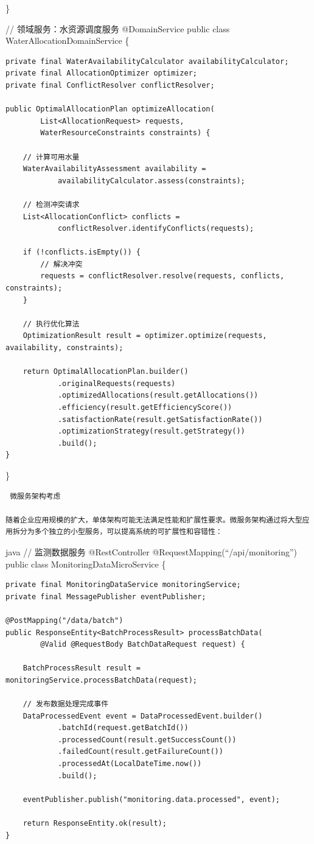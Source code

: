 \}

// 领域服务：水资源调度服务 @DomainService public class WaterAllocationDomainService \{

\begin{verbatim}
private final WaterAvailabilityCalculator availabilityCalculator;
private final AllocationOptimizer optimizer;
private final ConflictResolver conflictResolver;

public OptimalAllocationPlan optimizeAllocation(
        List<AllocationRequest> requests, 
        WaterResourceConstraints constraints) {
    
    // 计算可用水量
    WaterAvailabilityAssessment availability = 
            availabilityCalculator.assess(constraints);
    
    // 检测冲突请求
    List<AllocationConflict> conflicts = 
            conflictResolver.identifyConflicts(requests);
    
    if (!conflicts.isEmpty()) {
        // 解决冲突
        requests = conflictResolver.resolve(requests, conflicts, constraints);
    }
    
    // 执行优化算法
    OptimizationResult result = optimizer.optimize(requests, availability, constraints);
    
    return OptimalAllocationPlan.builder()
            .originalRequests(requests)
            .optimizedAllocations(result.getAllocations())
            .efficiency(result.getEfficiencyScore())
            .satisfactionRate(result.getSatisfactionRate())
            .optimizationStrategy(result.getStrategy())
            .build();
}
\end{verbatim}

\}

\begin{lstlisting}
 微服务架构考虑

随着企业应用规模的扩大，单体架构可能无法满足性能和扩展性要求。微服务架构通过将大型应用拆分为多个独立的小型服务，可以提高系统的可扩展性和容错性：
\end{lstlisting}

java // 监测数据服务 @RestController @RequestMapping(``/api/monitoring'') public class MonitoringDataMicroService \{

\begin{verbatim}
private final MonitoringDataService monitoringService;
private final MessagePublisher eventPublisher;

@PostMapping("/data/batch")
public ResponseEntity<BatchProcessResult> processBatchData(
        @Valid @RequestBody BatchDataRequest request) {
    
    BatchProcessResult result = monitoringService.processBatchData(request);
    
    // 发布数据处理完成事件
    DataProcessedEvent event = DataProcessedEvent.builder()
            .batchId(request.getBatchId())
            .processedCount(result.getSuccessCount())
            .failedCount(result.getFailureCount())
            .processedAt(LocalDateTime.now())
            .build();
            
    eventPublisher.publish("monitoring.data.processed", event);
    
    return ResponseEntity.ok(result);
}
\end{verbatim}

